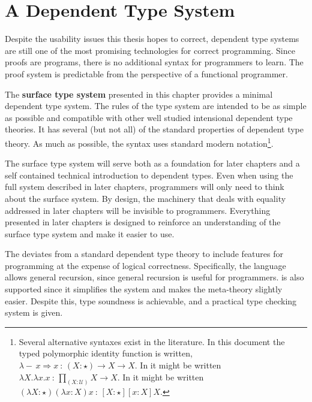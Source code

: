 \chapter{A Dependent Type System}
\label{chapter:Surface}
\thispagestyle{myheadings}
 
 
Despite the usability issues this thesis hopes to correct, dependent type systems are still one of the most promising technologies for correct programming.
Since proofs are programs, there is no additional syntax for programmers to learn.
The proof system is predictable from the perspective of a functional programmer.
 
The \textbf{surface type system} presented in this chapter provides a minimal dependent type system.
The rules of the type system are intended to be as simple as possible and compatible with other well studied intensional dependent type theories.
It has several (but not all) of the standard properties of dependent type theory.
As much as possible, the syntax uses standard modern notation\footnote{
 Several alternative syntaxes exist in the literature.
 In this document the typed polymorphic identity function is written, $\lambda-\,x\Rightarrow x\ :\,\left(X:\star\right)\rightarrow X\rightarrow X$.
 In \cite{HoTTbook} it might be written $\lambda X.\lambda x.x\ :\,\underset{\left(X:\mathcal{U}\right)}{\prod}X\rightarrow X$.
 In \cite{10.1016/0890-5401(88)90005-3} it might be written $\left(\lambda X:\star\right)\left(\lambda x:X\right)x\ :\,\left[X:\star\right]\left[x:X\right]X$.
}.
 
The surface type system will serve both as a foundation for later chapters and a self contained technical introduction to dependent types.
Even when using the full system described in later chapters, programmers will only need to think about the surface system.
By design, the machinery that deals with equality addressed in later chapters will be invisible to programmers.
Everything presented in later chapters is designed to reinforce an understanding of the surface type system and make it easier to use.
 
The \slang{} deviates from a standard dependent type theory to include features for programming at the expense of logical correctness.
Specifically, the language allows general recursion, since general recursion is useful for programmers.
\Tit{} is also supported since it simplifies the system and makes the meta-theory slightly easier.
Despite this, type soundness is achievable, and a practical type checking system is given.
 
